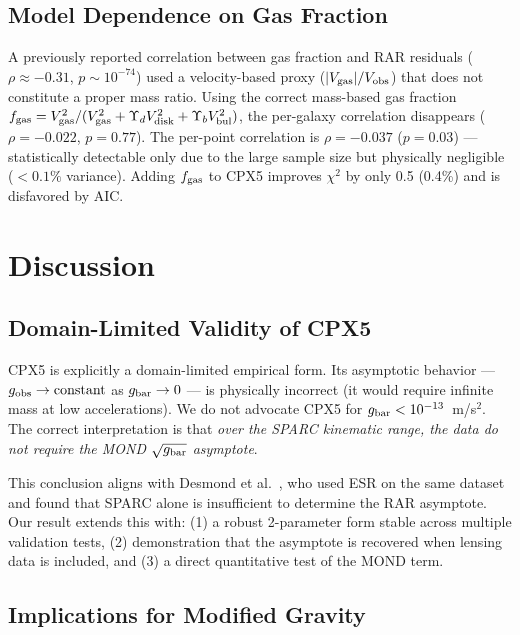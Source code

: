 \documentclass[twocolumn]{aastex631}
\begin{document}
\subsection{Model Dependence on Gas Fraction}

A previously reported correlation between gas fraction and RAR residuals
($\rho\approx-0.31$, $p\sim 10^{-74}$) used a velocity-based proxy
($|V_{\rm gas}|/V_{\rm obs}$) that does not constitute a proper mass ratio.
Using the correct mass-based gas fraction $f_{\rm gas} = V_{\rm gas}^2 /
(V_{\rm gas}^2 + \Upsilon_d V_{\rm disk}^2 + \Upsilon_b V_{\rm bul}^2)$, the
per-galaxy correlation disappears ($\rho=-0.022$, $p=0.77$).  The per-point
correlation is $\rho=-0.037$ ($p=0.03$) --- statistically detectable only
due to the large sample size but physically negligible ($<0.1\%$ variance).
Adding $f_{\rm gas}$ to CPX5 improves $\chi^2$ by only 0.5 (0.4\%) and is
disfavored by AIC.

\section{Discussion}

\subsection{Domain-Limited Validity of CPX5}

CPX5 is explicitly a domain-limited empirical form.  Its asymptotic behavior
--- $g_{\rm obs} \to \text{constant}$ as $g_{\rm bar} \to 0$ --- is physically
incorrect (it would require infinite mass at low accelerations).  We do not
advocate CPX5 for $g_{\rm bar} < 10^{-13}$~m/s$^2$.  The correct
interpretation is that \emph{over the SPARC kinematic range, the data do not
require the MOND $\sqrt{g_{\rm bar}}$ asymptote}.

This conclusion aligns with Desmond et al.~\cite{desmond2023}, who used
ESR on the same dataset and found that SPARC alone is insufficient to
determine the RAR asymptote.  Our result extends this with:
(1) a robust 2-parameter form stable across multiple validation tests,
(2) demonstration that the asymptote is recovered when lensing data is
included, and (3) a direct quantitative test of the MOND term.

\subsection{Implications for Modified Gravity}
\end{document}
